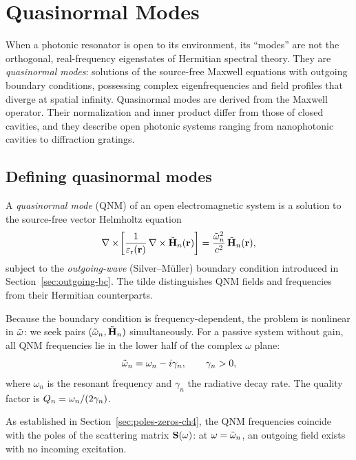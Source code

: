 \chapter{Quasinormal Modes}
\label{ch:qnm}

\begin{chapterlead}
When a photonic resonator is open to its environment, its ``modes'' are
not the orthogonal, real-frequency eigenstates of Hermitian spectral
theory. They are \emph{quasinormal modes}: solutions of the source-free
Maxwell equations with outgoing boundary conditions, possessing complex
eigenfrequencies and field profiles that diverge at spatial infinity.
Quasinormal modes are derived from the Maxwell operator. Their
normalization and inner product differ from those of closed cavities,
and they describe open photonic systems ranging from nanophotonic
cavities to diffraction gratings.
\end{chapterlead}


\section{Defining quasinormal modes}
\label{sec:qnm-definition}

A \emph{quasinormal mode} (QNM) of an open electromagnetic system is a
solution to the source-free vector Helmholtz equation
\begin{equation}
 \nabla\times\!\left[\frac{1}{\varepsilon_{\mathrm{r}}(\mathbf{r})}\,\nabla\times\tilde{\mathbf{H}}_n(\mathbf{r})\right]
 = \frac{\tilde{\omega}_n^2}{c^2}\,\tilde{\mathbf{H}}_n(\mathbf{r}),
 \label{eq:qnm-evp}
\end{equation}
subject to the \emph{outgoing-wave} (Silver--M\"uller) boundary condition
introduced in Section~\ref{sec:outgoing-bc}. The tilde distinguishes QNM
fields and frequencies from their Hermitian counterparts.

Because the boundary condition is frequency-dependent, the problem is
nonlinear in $\tilde{\omega}$: we seek pairs $(\tilde{\omega}_n, \tilde{\mathbf{H}}_n)$
simultaneously. For a passive system without gain, all QNM frequencies
lie in the lower half of the complex $\omega$ plane:
\begin{equation}
 \tilde{\omega}_n = \omega_n - i\gamma_n, \qquad \gamma_n > 0,
 \label{eq:qnm-freq}
\end{equation}
where $\omega_n$ is the resonant frequency and $\gamma_n$ the radiative
decay rate. The quality factor is $Q_n = \omega_n/(2\gamma_n)$.

As established in Section~\ref{sec:poles-zeros-ch4}, the QNM frequencies
coincide with the poles of the scattering matrix $\mathbf{S}(\omega)$: at
$\omega = \tilde{\omega}_n$, an outgoing field exists with no incoming excitation.

